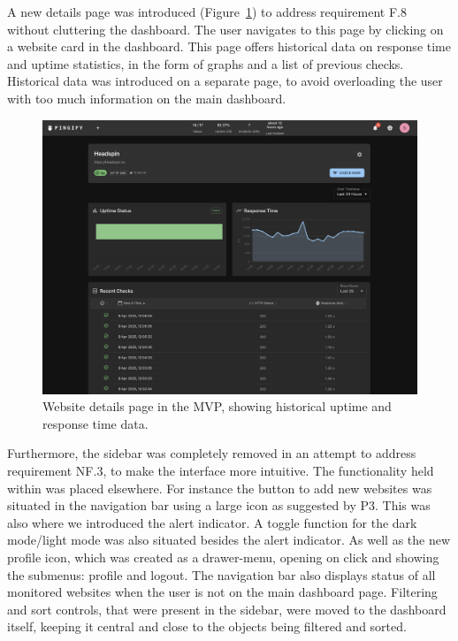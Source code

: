 A new details page was introduced (Figure~\ref{fig:website_details_mvp}) to address requirement F.8 without cluttering the dashboard. The user navigates to this page by clicking on a website card in the dashboard. This page offers historical data on response time and uptime statistics, in the form of graphs and a list of previous checks. Historical data was introduced on a separate page, to avoid overloading the user with too much information on the main dashboard.


\begin{figure}[H]
  \centering
  \includegraphics[width=\textwidth]{figures/MVP-dashboard/MVP-websitedetails.png}
  \caption{Website details page in the MVP, showing historical uptime and response time data.}
  \label{fig:website_details_mvp}
\end{figure}
 

Furthermore, the sidebar was completely removed in an attempt to address requirement NF.3, to make the interface more intuitive. The functionality held within was placed elsewhere. For instance the button to add new websites was situated in the navigation bar using a large icon as suggested by P3. This was also where we introduced the alert indicator.  A toggle function for the dark mode/light mode was also situated besides the alert indicator. As well as the new profile icon, which was created as a drawer-menu, opening on click and showing the submenus: profile and logout. The navigation bar also displays status of all monitored websites when the user is not on the main dashboard page. Filtering and sort controls, that were present in the sidebar, were moved to the dashboard itself, keeping it central and close to the objects being filtered and sorted.

